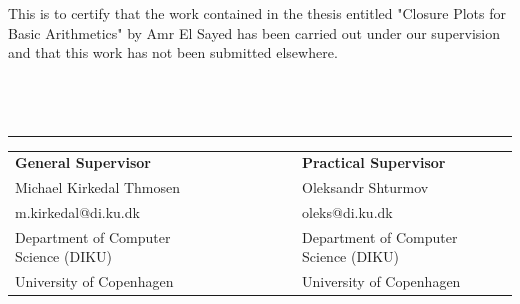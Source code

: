 \documentclass[11pt]{article}
\begin{document}
This is to certify that the work contained in the thesis entitled "Closure Plots for Basic Arithmetics" by Amr El Sayed has been carried out under our supervision and that this work has not been submitted elsewhere.\\\\\\\\
\begin{center}\noindent\rule{8cm}{0.4pt}%

\begin{tabular}{ l l l c r l l l}\\
    \textbf{General Supervisor} & & & & & & \textbf{Practical Supervisor} \\
    Michael Kirkedal Thmosen & & & & & & Oleksandr Shturmov\\
    m.kirkedal@di.ku.dk & & & & & & oleks@di.ku.dk\\
    Department of Computer Science (DIKU) & & & & & & Department of Computer Science (DIKU)\\
    University of Copenhagen & & & & & & University of Copenhagen\\
\end{tabular}
\end{center}
\end{document}
